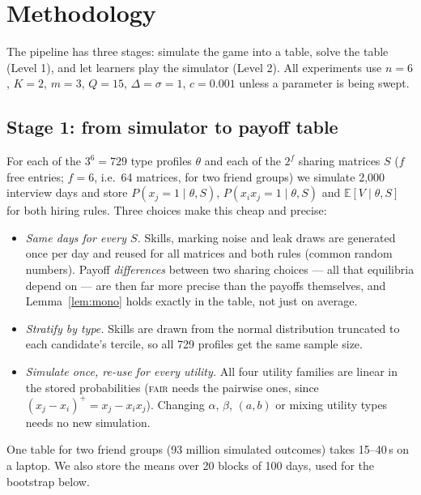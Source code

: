 \documentclass[10pt]{article}
\theoremstyle{plain}
\theoremstyle{definition}\newtheorem{definition}{Definition}
\newcommand{\E}{\mathbb{E}}\newcommand{\1}{\mathbf{1}}
\begin{document}
\section{Methodology}\label{sec:method}
The pipeline has three stages: simulate the game into a table, solve the table (Level 1), and let learners play the simulator (Level 2).
All experiments use $n=6$, $K=2$, $m=3$, $Q=15$, $\Delta=\sigma=1$, $c=0.001$ unless a parameter is being swept.

\subsection{Stage 1: from simulator to payoff table}
For each of the $3^6=729$ type profiles $\theta$ and each of the $2^f$ sharing matrices $S$ ($f$ free entries; $f=6$, i.e.\ 64 matrices,
for two friend groups) we simulate 2{,}000 interview days and store $P(x_j=1\mid\theta,S)$, $P(x_ix_j=1\mid\theta,S)$ and $\E[V\mid\theta,S]$ for both hiring rules.
Three choices make this cheap and precise:
\begin{itemize}
\item \emph{Same days for every $S$.} Skills, marking noise and leak draws are generated once per day and reused for all matrices and both rules
(common random numbers). Payoff \emph{differences} between two sharing choices --- all that equilibria depend on --- are then far more precise than
the payoffs themselves, and Lemma~\ref{lem:mono} holds exactly in the table, not just on average.
\item \emph{Stratify by type.} Skills are drawn from the normal distribution truncated to each candidate's tercile, so all 729 profiles get the same sample size.
\item \emph{Simulate once, re-use for every utility.} All four utility families are linear in the stored probabilities (\textsc{fair} needs the pairwise
ones, since $(x_j-x_i)^+=x_j-x_ix_j$). Changing $\alpha$, $\beta$, $(a,b)$ or mixing utility types needs no new simulation.
\end{itemize}
One table for two friend groups (93 million simulated outcomes) takes 15--40\,s on a laptop. We also store the means over 20 blocks of 100 days, used for the bootstrap below.
\end{document}
